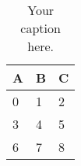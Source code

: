 \begin{table}[h!]
\centering
\begin{tabular}{|lll|}
\hline
\textbf{A} & \textbf{B} & \textbf{C} \\
\hline
0 & 1 & 2 \\
\hline
3 & 4 & 5 \\
\hline
6 & 7 & 8 \\
\hline
\end{tabular}
\caption{Your caption here.}
\label{table:your_label_here}
\end{table}